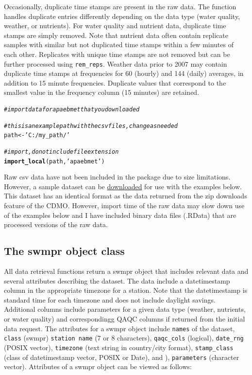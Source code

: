 \documentclass[10pt,letterpaper]{article}\usepackage[]{graphicx}\usepackage[]{color}
\makeatletter
\newcommand{\hlstr}[1]{\textcolor[rgb]{0.192,0.494,0.8}{#1}}%
\newcommand{\hlcom}[1]{\textcolor[rgb]{0.678,0.584,0.686}{\textit{#1}}}%
\newcommand{\hlstd}[1]{\textcolor[rgb]{0.345,0.345,0.345}{#1}}%
\newcommand{\hlkwb}[1]{\textcolor[rgb]{0.69,0.353,0.396}{#1}}%
\newcommand{\hlkwd}[1]{\textcolor[rgb]{0.737,0.353,0.396}{\textbf{#1}}}%
\newenvironment{kframe}{%
 \def\at@end@of@kframe{}%
 \ifinner\ifhmode%
  \def\at@end@of@kframe{\end{minipage}}%
  \begin{minipage}{\columnwidth}%
 \fi\fi%
 \def\FrameCommand##1{\hskip\@totalleftmargin \hskip-\fboxsep
 \colorbox{shadecolor}{##1}\hskip-\fboxsep
     \hskip-\linewidth \hskip-\@totalleftmargin \hskip\columnwidth}%
 \MakeFramed {\advance\hsize-\width
   \@totalleftmargin\z@ \linewidth\hsize
   \@setminipage}}%
 {\par\unskip\endMakeFramed%
 \at@end@of@kframe}
\newenvironment{knitrout}{}{} %
\makeatother
\begin{document}
Occasionally, duplicate time stamps are present in the raw data.  The function handles duplicate entries differently depending on the data type (water quality,  weather, or nutrients).  For water quality and nutrient data, duplicate time stamps are simply removed.  Note that nutrient data often contain replicate samples with similar but not duplicated time stamps within a few minutes of each other.  Replicates with unique time stamps are not removed but can be further processed using \texttt{rem\_reps}.  Weather data prior to 2007 may contain duplicate time stamps at frequencies for 60 (hourly) and 144 (daily) averages, in addition to 15 minute frequencies.  Duplicate values that correspond to the smallest value in the frequency column (15 minutes) are retained.  

\begin{knitrout}
\color{fgcolor}\begin{kframe}
\begin{alltt}
\hlcom{# import data for apaebmet that you downloaded}

\hlcom{# this is an example path with the csv files, change as needed}
\hlstd{path} \hlkwb{<-} \hlstr{'C:/my_path/'}

\hlcom{# import, do not include file extension}
\hlkwd{import_local}\hlstd{(path,} \hlstr{'apaebmet'}\hlstd{)}
\end{alltt}
\end{kframe}
\end{knitrout}

Raw csv data have not been included in the package due to size limitations.  However, a sample dataset can be \href{https://s3.amazonaws.com/swmpexdata/zip_ex.zip}{downloaded} for use with the examples below.  This dataset has an identical format as the data returned from the zip downloads feature of the \ac{CDMO}.  However, import time of the raw data may slow down use of the examples below and I have included binary data files (.RData) that are processed versions of the raw data.    

\subsection*{The swmpr object class}

All data retrieval functions return a swmpr object that includes relevant data and several attributes describing the dataset.  The data include a datetimestamp column in the appropriate timezone for a station.  Note that the datetimestamp is standard time for each timezone and does not include daylight savings. Additional columns include parameters for a given data type (weather, nutrients, or water quality) and correspondingg QAQC columns if returned from the initial data request.  The attributes for a swmpr object include \texttt{names} of the dataset, \texttt{class} (swmpr) \texttt{station name} (7 or 8 characters), \texttt{qaqc\_cols} (logical), \texttt{date\_rng} (POSIX vector), \texttt{timezone} (text string in country/city format), \texttt{stamp\_class} (class of datetimestamp vector, POSIX or Date), and ), \texttt{parameters} (character vector).  Attributes of a swmpr object can be viewed as follows:
\end{document}
